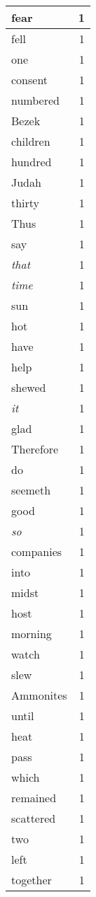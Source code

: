 \begin{center}
\begin{longtable}{l|r}
fear & 1 \\ \hline
fell & 1 \\ \hline
one & 1 \\ \hline
consent & 1 \\ \hline
numbered & 1 \\ \hline
Bezek & 1 \\ \hline
children & 1 \\ \hline
hundred & 1 \\ \hline
Judah & 1 \\ \hline
thirty & 1 \\ \hline
Thus & 1 \\ \hline
say & 1 \\ \hline
\emph{that} & 1 \\ \hline
\emph{time} & 1 \\ \hline
sun & 1 \\ \hline
hot & 1 \\ \hline
have & 1 \\ \hline
help & 1 \\ \hline
shewed & 1 \\ \hline
\emph{it} & 1 \\ \hline
glad & 1 \\ \hline
Therefore & 1 \\ \hline
do & 1 \\ \hline
seemeth & 1 \\ \hline
good & 1 \\ \hline
\emph{so} & 1 \\ \hline
companies & 1 \\ \hline
into & 1 \\ \hline
midst & 1 \\ \hline
host & 1 \\ \hline
morning & 1 \\ \hline
watch & 1 \\ \hline
slew & 1 \\ \hline
Ammonites & 1 \\ \hline
until & 1 \\ \hline
heat & 1 \\ \hline
pass & 1 \\ \hline
which & 1 \\ \hline
remained & 1 \\ \hline
scattered & 1 \\ \hline
two & 1 \\ \hline
left & 1 \\ \hline
together & 1 \\ \hline

\end{longtable}
\end{center}
